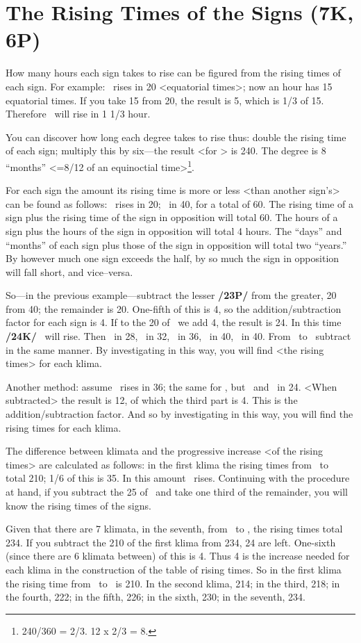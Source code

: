 \section{The Rising Times of the Signs (7K, 6P)}
How many hours each sign takes to rise can be figured from the rising times of each sign. For example: \Aries\, rises in 20 <equatorial times>; now an hour has 15 equatorial times. If you take 15 from 20, the result is 5, which is 1/3 of 15. Therefore \Aries\, will rise in 1 1/3 hour.

You can discover how long each degree takes to rise thus: double the rising time of each sign; multiply this by six—the result <for \Aries> is 240. The degree is 8 “months” <=8/12 of an equinoctial time>\footnote{240/360 = 2/3. 12 x 2/3 = 8.}.

For each sign the amount its rising time is more or less <than another sign’s> can be found as follows: \Aries\, rises in 20; \Libra\, in 40, for a total of 60. The rising time of a sign plus the rising time of the sign in opposition will total 60. The hours of a sign plus the hours of the sign in opposition will total 4 hours. The “days” and “months” of each sign plus those of the sign in opposition will total two “years.” By however much one sign exceeds the half, by so much the sign in opposition will fall short, and vice–versa. 

So—in the previous example—subtract the lesser \textbf{/23P/} from the greater, 20 from 40; the remainder is 20. One-fifth of this is 4, so the addition/subtraction factor for each sign is 4. If to the 20 of \Aries\, we add 4, the result is 24. In this time \textbf{/24K/} \Taurus\, will rise. Then \Gemini\, in 28, \Cancer\, in 32, \Leo\, in 36, \Virgo\, in 40, \Libra\, in 40. From \Scorpio\, to \Pisces\, subtract in the same manner. By investigating in this way, you will find <the rising times> for each klima.

Another method: assume \Leo\, rises in 36; the same for \Scorpio, but \Taurus\, and \Aquarius\, in 24. <When subtracted> the result is 12, of which the third part is 4. This is the addition/subtraction factor. And so by investigating in this way, you will find the rising times for each klima.

The difference between klimata and the progressive increase <of the rising times> are calculated as follows: in the first klima the rising times from \Cancer\, to \Sagittarius\, total 210; 1/6 of this is 35. In this amount \Leo\, rises. Continuing with the procedure at hand, if you subtract the 25 of \Aquarius\, and take one third of the remainder, you will know the rising times of the signs.

Given that there are 7 klimata, in the seventh, from \Cancer\, to \Sagittarius, the rising times total 234. If
you subtract the 210 of the first klima from 234, 24 are left. One-sixth (since there are 6 klimata between) of this is 4. Thus 4 is the increase needed for each klima in the construction of the table of rising times. So in the first klima the rising time from \Cancer\, to \Sagittarius\, is 210. In the second klima, 214; in the
third, 218; in the fourth, 222; in the fifth, 226; in the sixth, 230; in the seventh, 234.

\newpage